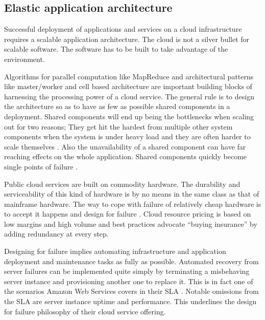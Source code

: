 \documentclass[english]{tktltiki2}
\theoremstyle{definition}
\theoremstyle{remark}
\begin{document}
\subsection{Elastic application architecture}

Successful deployment of applications and services on a cloud infrastructure
requires a scalable application architecture. The cloud is not a silver bullet
for scalable software. The software has to be built to take advantage of the
environment.

Algorithms for parallel computation like MapReduce and architectural patterns
like master/worker and cell based architecture are important building blocks of
harnessing the processing power of a cloud service. The general rule is to
design the architecture so as to have as few as possible shared components in a
deployment. Shared components will end up being the bottlenecks when scaling out
for two reasons; They get hit the hardest from multiple other system components
when the system is under heavy load and they are often harder to scale
themselves . Also the unavailability
of a shared component can have far reaching effects on the whole application.
Shared components quickly become single points of failure .

Public cloud services are built on commodity hardware. The durability and
serviceability of this kind of hardware is by no means in the same class as that
of mainframe hardware. The way to cope with failure of relatively cheap hardware
is to accept it happens and design for failure . Cloud resource pricing is
based on low margins and high volume  and best practices advocate
``buying insurance'' by adding redundancy at every step.

Designing for failure implies automating infrastructure and application
deployment and maintenance tasks as fully as possible. Automated recovery from
server failures can be implemented quite simply by terminating a misbehaving
server instance and provisioning another one to replace it. This is in fact one
of the scenarios Amazon Web Services covers in their SLA . Notable omissions from the SLA are server instance uptime and performance.
This underlines the design for failure philosophy of their cloud service
offering.

\end{document}
